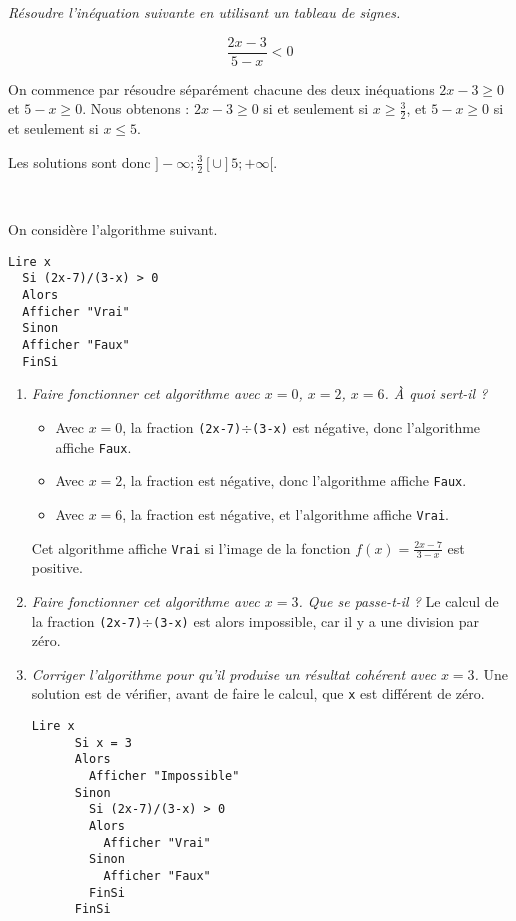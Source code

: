 \documentclass[12pt]{article}
\begin{document}
\begin{exercice}
  \emph{Résoudre l'inéquation suivante en utilisant un tableau de signes.}

  \[\frac{2x-3}{5-x}<0\]

  On commence par résoudre séparément chacune des deux inéquations $2x-3\geq0$ et $5-x\geq0$. Nous obtenons : $2x-3\geq0$ si et seulement si $x\geq\frac{3}{2}$, et $5-x\geq0$ si et seulement si $x\leq5$.

  \begin{center}
  \end{center}
  Les solutions sont donc $]-\infty;\frac{3}{2}[\cup]5;+\infty[$.
\end{exercice}

\begin{exercice}~

  On considère l'algorithme suivant.
  \begin{lstlisting}[language=naturel,frame=lines,mathescape=true]
  Lire x
  Si (2x-7)/(3-x) > 0
  Alors
  Afficher "Vrai"
  Sinon
  Afficher "Faux"
  FinSi
  \end{lstlisting}
  \begin{enumerate}
    \item \emph{Faire fonctionner cet algorithme avec $x=0$, $x=2$, $x=6$. À quoi sert-il ?}
    \begin{itemize}
      \item Avec $x=0$, la fraction \texttt{(2x-7)$\div$(3-x)} est négative, donc l'algorithme affiche \texttt{Faux}.
      \item Avec $x=2$, la fraction est négative, donc l'algorithme affiche \texttt{Faux}.
      \item Avec $x=6$, la fraction est négative, et l'algorithme affiche \texttt{Vrai}.
    \end{itemize}
    Cet algorithme affiche \texttt{Vrai} si l'image de la fonction $f(x)=\frac{2x-7}{3-x}$ est positive.
  \item \emph{Faire fonctionner cet algorithme avec $x=3$. Que se passe-t-il ?}
    Le calcul de la fraction \texttt{(2x-7)$\div$(3-x)} est alors impossible, car il y a une division par zéro.
  \item \emph{Corriger l'algorithme pour qu'il produise un résultat cohérent avec $x=3$.} Une solution est de vérifier, avant de faire le calcul, que \texttt{x} est différent de zéro.
    \begin{lstlisting}[language=naturel,frame=lines,mathescape=true]
      Lire x
      Si x = 3
      Alors
        Afficher "Impossible"
      Sinon
        Si (2x-7)/(3-x) > 0
        Alors
          Afficher "Vrai"
        Sinon
          Afficher "Faux"
        FinSi
      FinSi
    \end{lstlisting}
  \end{enumerate}
\end{exercice}
\end{document}
